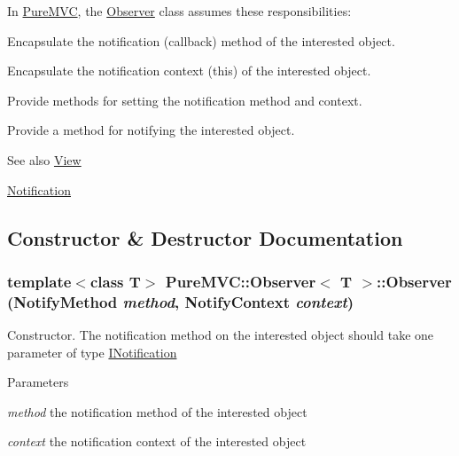 In \hyperlink{namespace_pure_m_v_c}{PureMVC}, the {\ttfamily \hyperlink{class_pure_m_v_c_1_1_observer}{Observer}} class assumes these responsibilities: 
\begin{DoxyItemize}
\item Encapsulate the notification (callback) method of the interested object. 
\item Encapsulate the notification context (this) of the interested object. 
\item Provide methods for setting the notification method and context. 
\item Provide a method for notifying the interested object. 
\end{DoxyItemize}

\begin{DoxySeeAlso}{See also}
\hyperlink{class_pure_m_v_c_1_1_view}{View} 

\hyperlink{class_pure_m_v_c_1_1_notification}{Notification} 
\end{DoxySeeAlso}


\subsection{Constructor \& Destructor Documentation}
\hypertarget{class_pure_m_v_c_1_1_observer_a8cbe9fac70f2e56a976afaad3fd64d4d}{
\subsubsection[{Observer}]{\setlength{\rightskip}{0pt plus 5cm}template$<$class T$>$ {\bf PureMVC::Observer}$<$ T $>$::{\bf Observer} (NotifyMethod {\em method}, \/  NotifyContext {\em context})}}
\label{class_pure_m_v_c_1_1_observer_a8cbe9fac70f2e56a976afaad3fd64d4d}


Constructor. The notification method on the interested object should take one parameter of type {\ttfamily \hyperlink{class_pure_m_v_c_1_1_i_notification}{INotification}}


\begin{DoxyParams}{Parameters}
\item[{\em method}]the notification method of the interested object \item[{\em context}]the notification context of the interested object \end{DoxyParams}


